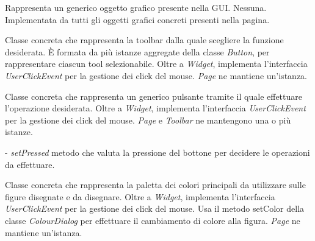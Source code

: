 Rappresenta un generico oggetto grafico presente nella GUI.
Nessuna.
Implementata da tutti gli oggetti grafici concreti presenti nella pagina.

Classe concreta che rappresenta la toolbar dalla quale scegliere la funzione desiderata.
\` E formata da pi\` u istanze aggregate della classe \textit{Button}, per rappresentare ciascun tool selezionabile. Oltre a \textit{Widget}, implementa l'interfaccia \textit{UserClickEvent} per la gestione dei click del mouse. 
\textit{Page} ne mantiene un'istanza.

Classe concreta che rappresenta un generico pulsante tramite il quale effettuare l'operazione desiderata.
Oltre a \textit{Widget}, implementa l'interfaccia \textit{UserClickEvent} per la gestione dei click del mouse.  
\textit{Page} e \textit{Toolbar }ne mantengono una o pi\` u istanze.
\begin{elencopuntato}[\normindent]
\item[-]  \textit{setPressed} metodo che valuta la pressione del bottone per decidere le operazioni da effettuare.
\end{elencopuntato}

Classe concreta che rappresenta la paletta dei colori principali da utilizzare sulle figure disegnate e da disegnare.
Oltre a \textit{Widget}, implementa l'interfaccia \textit{UserClickEvent} per la gestione dei click del mouse. Usa il metodo setColor della classe \textit{ColourDialog} per effettuare il cambiamento di colore alla figura.
\textit{Page} ne mantiene un'istanza.

